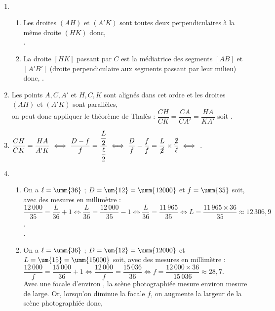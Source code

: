 \ \\ [-5mm]
\begin{enumerate}
   \item
   \begin{enumerate}
      \item Les droites $(AH)$ et $(A'K)$ sont toutes deux perpendiculaires à la même droite $(HK)$ donc, \\
      .
      \item La droite $[HK]$ passant par $C$ est la médiatrice des segments $[AB]$ et $[A'B']$ (droite perpendiculaire aux segments passant par leur milieu) donc, .
   \end{enumerate}
   \item Les points $A, C, A'$ et $H, C, K$ sont alignés dans cet ordre et les droites $(AH)$ et $(A'K)$ sont parallèles, \\ [1mm]
   on peut donc appliquer le théorème de Thalès : $\dfrac{CH}{CK} =\dfrac{CA}{CA'} =\dfrac{HA}{KA'}$ soit \quad {}. \\ [1mm]
   \item $\dfrac{CH}{CK} =\dfrac{HA}{A'K} \iff \dfrac{D-f}{f} =\dfrac{\dfrac{L}{2}}{\dfrac{\ell}{2}} \iff \dfrac{D}{f}-\dfrac{f}{f}=\dfrac{L}{\cancel{2}}\times\dfrac{\cancel{2}}{\ell} \iff$ . \\ [1mm]
   \item
   \begin{enumerate}
      \item On a $\ell =\umm{36}$ ; $D =\um{12} =\umm{12000}$ et $f =\umm{35}$ soit, avec des mesures en millimètre : \\ [1mm]
      $\dfrac{12\,000}{35} =\dfrac{L}{36}+1 \iff \dfrac{L}{36} =\dfrac{12\,000}{35}-1 \iff \dfrac{L}{36} =\dfrac{11\,965}{35} \iff L =\dfrac{11\,965\times36}{35} \approx 12\,306,9$. \\ [1mm]
      .
      \item On a $\ell =\umm{36}$ ; $D =\um{12} =\umm{12000}$ et $L =\um{15} =\umm{15000}$ soit, avec des mesures en millimètre : \\ [1mm]
      $\dfrac{12\,000}{f} =\dfrac{15\,000}{36}+1 \iff \dfrac{12\,000}{f}  =\dfrac{15\,036}{36} \iff f =\dfrac{12\,000\times36}{15\,036} \approx 28,7$. \\ [1mm]
      Avec une focale d'environ , la scène photographiée mesure environ mesure  de large. Or, lorsqu'on diminue la focale $f$, on augmente la largeur de la scène photographiée donc, \\
   \end{enumerate}
\end{enumerate}

